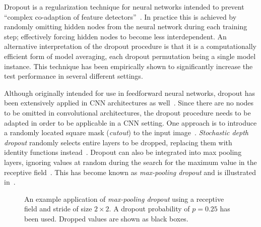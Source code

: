 Dropout is a regularization technique for neural networks intended to prevent \enquote{complex co-adaption of feature detectors}~\cite{dropout-original-paper}.
In practice this is achieved by randomly omitting hidden nodes from the neural network during each training step; effectively forcing hidden nodes to become less interdependent.
An alternative interpretation of the dropout procedure is that it is a computationally efficient form of model averaging, each dropout permutation being a single model instance.
This technique has been empirically shown to significantly increase the test performance in several different settings.

Although originally intended for use in feedforward neural networks, dropout has been extensively applied in CNN architectures as well~\cite{dropout-cnn}.
Since there are no nodes to be omitted in convolutional architectures, the dropout procedure needs to be adapted in order to be applicable in a CNN setting.
One approach is to introduce a randomly located square mask (\textit{cutout}) to the input image~\cite{dropout-cutout}.
\textit{Stochastic depth dropout} randomly selects entire layers to be dropped, replacing them with identity functions instead~\cite{dropout-stochastic-depth}.
Dropout can also be integrated into max pooling layers, ignoring values at random during the search for the maximum value in the receptive field~\cite{max-pooling-dropout}.
This has become known as \textit{max-pooling dropout} and is illustrated in~.

\begin{figure}[htb]
  
  \caption{%
    An example application of \textit{max-pooling dropout} using a receptive field and stride of size $2 \times 2$.
    A dropout probability of $p = 0.25$ has been used.
    Dropped values are shown as black boxes.
  }%
  \label{fig:max-pooling-dropout}
\end{figure}
